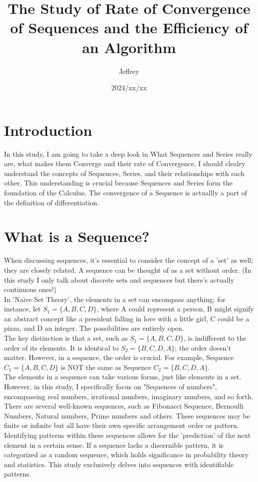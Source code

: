 \documentclass{article}
\title{The Study of Rate of Convergence of Sequences and the Efficiency of an Algorithm}
\author{Jeffrey}
\date{2024/xx/xx}
\begin{document}
\maketitle
  \section{Introduction}
  In this study, I am going to take a deep look in What Sequences and Series really are, what makes them Converge and their rate of Convergence. I should clealry understand the concepts of Sequences, Series, and their relationships with each other. This understanding is crucial because Sequences and Series form the foundation of the Calculus. The convergence of a Sequence is actuallly a part of the definition of differentiation.

  \section{What is a Sequence?}
  When discussing sequences, it's essential to consider the concept of a 'set' as well; they are closely related. A sequence can be thought of as a set without order. (In this study I only talk about discrete sets and sequences but there's actually continuous ones!) \\

  In 'Naive Set Theory', the elements in a set can encompass anything; for instance, let $S_1=\{A, B, C, D\}$, where A could represent a person, B might signify an abstract concept like a president falling in love with a little girl, C could be a pizza, and D an integer. The possibilities are entirely open. \\

  The key distinction is that a set, such as $S_1=\{A, B, C, D\}$, is indifferent to the order of its elements. It is identical to $S_2=\{B, C, D, A\}$; the order doesn't matter. However, in a sequence, the order is crucial. For example, Sequence $C_1=\{A, B, C, D\}$ is NOT the same as Sequence $C_2=\{B, C, D, A\}$. \\

  The elements in a sequence can take various forms, just like elements in a set. However, in this study, I specifically focus on "Sequences of numbers", encompassing real numbers, irrational numbers, imaginary numbers, and so forth. \\ 

  There are several well-known sequences, such as Fibonacci Sequence, Bernoulli Numbers, Natural numbers, Prime numbers and others. These sequences may be finite or infinite but all have their own specific arrangement order or pattern. Identifying patterns within these sequences allows for the 'prediction' of the next element in a certain sense. If a sequence lacks a discernible pattern, it is categorized as a random sequence, which holds significance in probability theory and statistics. This study exclusively delves into sequences with identifiable patterns. \\
\end{document}
